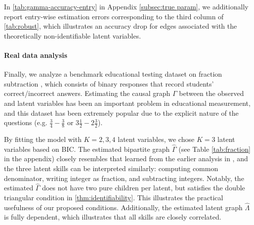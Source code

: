 \documentclass[10pt]{article} %
\def\hat{\widehat}
\begin{document}
In \cref{tab:gamma-accuracy-entry} in Appendix \ref{subsec:true param}, we additionally report entry-wise estimation errors corresponding to the third column of \cref{tab:robust}, which illustrates an accuracy drop for edges associated with the theoretically non-identifiable latent variables.

\paragraph{Real data analysis}
Finally, we analyze a benchmark educational testing dataset on fraction subtraction \citep{tatsuoka2002data}, which consists of binary responses that record students' correct/incorrect answers. Estimating the causal graph $\Gamma$ between the observed and latent variables has been an important problem in educational measurement, and this dataset has been extremely popular due to the explicit nature of the questions (e.g. $\frac{3}{4} - \frac{3}{8}$ or $3 \frac{1}{2} - 2 \frac{3}{2}$).

By fitting the model with $K=2,3,4$ latent variables, we chose $K=3$ latent variables based on BIC. The estimated bipartite graph $\hat{\Gamma}$ (see Table \ref{tab:fraction} in the appendix) closely resembles that learned from the earlier analysis in \cite{chen2015statistical}, and the three latent skills can be interpreted similarly: computing common denominator, writing integer as fraction, and subtracting integers. Notably, the estimated $\hat{\Gamma}$ does not have two pure children per latent, but satisfies the double triangular condition in \cref{thm:identifiability}. This illustrates the practical usefulness of our proposed conditions. Additionally, the estimated latent graph $\hat{\Lambda}$ is fully dependent, which illustrates that all skills are closely correlated.
\end{document}
